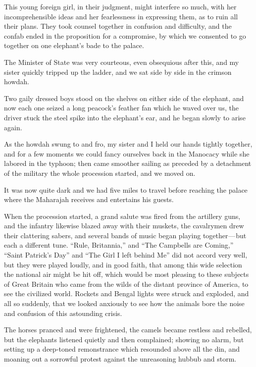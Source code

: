 \documentclass[12pt]{book}
\begin{document}
This young foreign girl, in their judgment, might interfere so much, with her
incomprehensible ideas and her fearlessness in expressing them, as to ruin all
their plans. They took counsel together in confusion and difficulty, and the confab
ended in the proposition for a compromise, by which we consented to go together
on one elephant’s bade to the palace.

The Minister of State was very courteous, even obsequious after this, and
my sister quickly tripped up the ladder, and we sat side by side in the crimson
howdah.

Two gaily dressed boys stood on the shelves on either side of the elephant,
and now each one seized a long peacock’s feather fan which he waved over us,
the driver stuck the steel spike into the elephant’s ear, and he began slowly to
arise again.

As the howdah swung to and fro, my sister and I held our hands tightly
together, and for a few moments we could fancy ourselves back in the Manocacy
while she labored in the typhoon; then came smoother sailing as preceded by a
detachment of the military the whole procession started, and we moved on.

It was now quite dark and we had five miles to travel before reaching the
palace where the Maharajah receives and entertains his guests.

When the procession started, a grand salute was fired from the artillery guns,
and the infantry likewise blazed away with their muskets, the cavalrymen drew
their clattering sabers, and several bands of music began playing together — but
each a different tune. “Rule, Britannia,” and “The Campbells are Coming,” “Saint
Patrick’s Day” and “The Girl I left behind Me” did not accord very well, but they
were played loudly, and in good faith, that among this wide selection the national
air might be hit off, which would be most pleasing to these subjects of Great
Britain who came from the wilds of the distant province of America, to see the
civilized world. Rockets and Bengal lights were struck and exploded, and all so
suddenly, that we looked anxiously to see how the animals bore the noise and
confusion of this astounding crisis.

The horses pranced and were frightened, the camels became restless and
rebelled, but the elephants listened quietly and then complained; showing no
alarm, but setting up a deep‐toned remonstrance which resounded above all the
din, and moaning out a sorrowful protest against the unreasoning hubbub and
storm.
\end{document}
